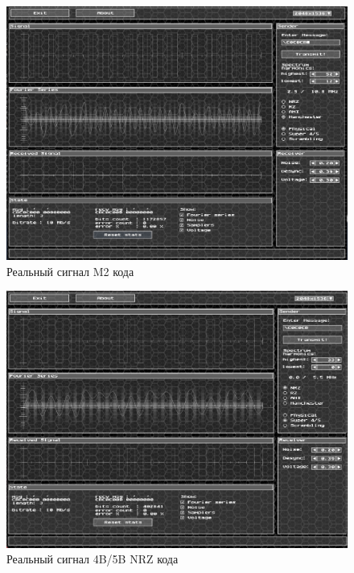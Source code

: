 \documentclass[12pt,onecolumn]{article}
\begin{document}
\begin{figure}[H]
    \centering
    \includegraphics[width=\textwidth]{image/nf-3.jpg}
    \caption{Реальный сигнал M2 кода}
\end{figure}
\begin{figure}[H]
    \centering
    \includegraphics[width=\textwidth]{image/nf-4.png}
    \caption{Реальный сигнал 4B/5B NRZ кода}
\end{figure}
\end{document}
